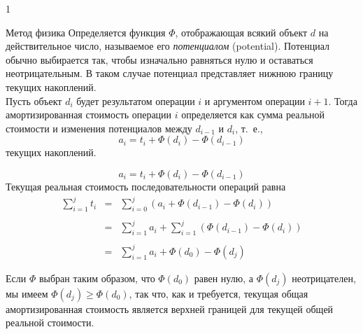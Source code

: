 \documentclass[aspectratio=169
  , xcolor={svgnames}
  , hyperref={ colorlinks,citecolor=DeepPink4
             , linkcolor=DarkRed,urlcolor=DarkBlue}
  , russian
  ]{beamer}
\newcommand{\term}[2]{\textit{#1} (#2)}
\newtheorem{remark}{\textbf{Замечание}}[section]
\theoremstyle{exerciseStyle1}
\begin{document}
\begin{frame}[fragile]{}
1
\end{frame}

\begin{frame}[fragile]{Метод физика}
Определяется функция $\Phi$, отображающая всякий
объект $d$ на действительное число, называемое его
\term{потенциалом}{potential}.  Потенциал обычно выбирается так, чтобы
изначально равняться нулю и оставаться неотрицательным. В таком случае
потенциал представляет нижнюю границу  текущих накоплений.\\

Пусть объект $d_i$ будет результатом операции $i$ и аргументом
операции $i+1$. Тогда амортизированная стоимость операции $i$
определяется как сумма реальной стоимости и изменения потенциалов между
$d_{i-1}$ и $d_i$, т.~е.,
$$
a_i = t_i + \Phi(d_i) - \Phi(d_{i-1})
$$
текущих накоплений.


\end{frame}


\begin{frame}[fragile]{}
$$
a_i = t_i + \Phi(d_i) - \Phi(d_{i-1})
$$
Текущая реальная стоимость последовательности операций равна
$$
\begin{array}{rcl}
\sum_{i=1}^j t_i & = & \sum_{i=0}^j (a_i + \Phi(d_{i-1}) - \Phi(d_i))\\
\\
& = & \sum_{i=1}^j a_i + \sum_{i=1}^j (\Phi(d_{i-1}) - \Phi(d_i)) \\
\\
& = & \sum_{i=1}^j a_i + \Phi(d_0) - \Phi(d_j)
\end{array}
$$

Если $\Phi$ выбран таким образом, что
$\Phi(d_0)$ равен нулю, а $\Phi(d_j)$ неотрицателен, мы имеем
$\Phi(d_j) \ge \Phi(d_0)$, так что, как и требуется, текущая общая
амортизированная стоимость является верхней границей для текущей общей
реальной стоимости.

\end{frame}

\begin{comment}
\begin{remark}
Такое описание метода физика несколько упрощает
картину. Часто при анализе оказывается трудно втиснуть реальное
положение дел в указанные рамки. Например, что делать с функциями,
которые порождают или возвращают более одного объекта? Однако даже
упрощенное описание достаточно для демонстрации основных идей.
\end{remark}

\end{comment}
\end{document}
